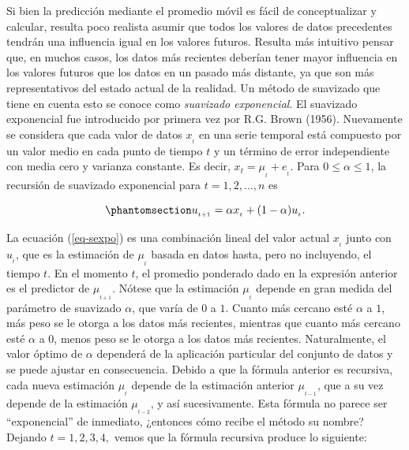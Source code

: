 \documentclass[
  us-letterpaper,
]{scrreprt}
\theoremstyle{plain}
\theoremstyle{definition}
\theoremstyle{definition}
\theoremstyle{plain}
\theoremstyle{remark}
\begin{document}
Si bien la predicción mediante el promedio móvil es fácil de
conceptualizar y calcular, resulta poco realista asumir que todos los
valores de datos precedentes tendrán una influencia igual en los valores
futuros. Resulta más intuitivo pensar que, en muchos casos, los datos
más recientes deberían tener mayor influencia en los valores futuros que
los datos en un pasado más distante, ya que son más representativos del
estado actual de la realidad. Un método de suavizado que tiene en cuenta
esto se conoce como \emph{suavizado exponencial}. El suavizado
exponencial fue introducido por primera vez por R.G. Brown (1956).
Nuevamente se considera que cada valor de datos \(x_{_t}\) en una serie
temporal está compuesto por un valor medio en cada punto de tiempo \(t\)
y un término de error independiente con media cero y varianza constante.
Es decir, \(x_{t}=\mu_{_t}+e_{_t}\). Para \(0 \leq \alpha \leq 1\), la
recursión de suavizado exponencial para \(t =1, 2, \ldots, n\) es

\begin{equation}\phantomsection\label{eq-sexpo}{
u_{_{t+1}}=\alpha x_{_t}+ (1-\alpha)u_{_t}.
}\end{equation}

La ecuación (\ref{eq-sexpo}) es una combinación lineal del valor actual
\(x_{_t}\) junto con \(u_{_t}\), que es la estimación de \(\mu_{_t}\)
basada en datos hasta, pero no incluyendo, el tiempo \(t\). En el
momento \(t\), el promedio ponderado dado en la expresión anterior es el
predictor de \(\mu_{_{t+1}}\). Nótese que la estimación \(\mu_{_t}\)
depende en gran medida del parámetro de suavizado \(\alpha\), que varía
de \(0\) a \(1\). Cuanto más cercano esté \(\alpha\) a \(1\), más peso
se le otorga a los datos más recientes, mientras que cuanto más cercano
esté \(\alpha\) a \(0\), menos peso se le otorga a los datos más
recientes. Naturalmente, el valor óptimo de \(\alpha\) dependerá de la
aplicación particular del conjunto de datos y se puede ajustar en
consecuencia. Debido a que la fórmula anterior es recursiva, cada nueva
estimación \(\mu_{_t}\) depende de la estimación anterior
\(\mu_{_{t-1}}\), que a su vez depende de la estimación
\(\mu_{_{t-2}}\), y así sucesivamente. Esta fórmula no parece ser
``exponencial'' de inmediato, ¿entonces cómo recibe el método su nombre?
Dejando \(t = 1, 2, 3, 4,\) vemos que la fórmula recursiva produce lo
siguiente:
\end{document}
